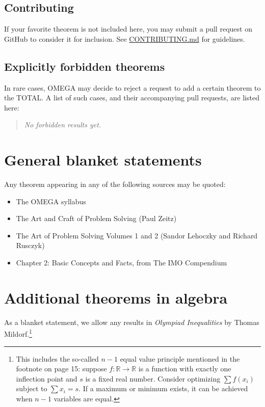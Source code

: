 \documentclass[11pt]{scrartcl}
\providecommand{\RR}{\mathbb R}
\begin{document}
\subsection{Contributing}
If your favorite theorem is not included here,
you may submit a pull request on GitHub to consider it for inclusion.
See \href{https://github.com/omegausa/total/blob/main/CONTRIBUTING.md}{CONTRIBUTING.md}
for guidelines.

\subsection{Explicitly forbidden theorems}
\label{sec:forbidden}
In rare cases, OMEGA may decide to reject a request to add a certain theorem to the TOTAL.
A list of such cases, and their accompanying pull requests, are listed here:
\begin{quote}
  \emph{No forbidden results yet.}
\end{quote}

\newpage

\section{General blanket statements}
Any theorem appearing in any of the following sources may be quoted:
\begin{itemize}
  \item The OMEGA syllabus
  \item The Art and Craft of Problem Solving (Paul Zeitz)
  \item The Art of Problem Solving Volumes 1 and 2 (Sandor Lehoczky and Richard Rusczyk)
  \item Chapter 2: Basic Concepts and Facts, from The IMO Compendium
\end{itemize}

\section{Additional theorems in algebra}
As a blanket statement, we allow any results in
\emph{Olympiad Inequalities} by Thomas Mildorf.\footnote{This includes the so-called
  $n-1$ equal value principle mentioned in the footnote on page 15:
  suppose $f \colon \RR \to \RR$ is a function
  with exactly one inflection point and $s$ is a fixed real number.
  Consider optimizing $\sum f(x_i)$ subject to $\sum x_i = s$.
  If a maximum or minimum exists, it can be achieved when $n-1$ variables are equal.}
\end{document}
